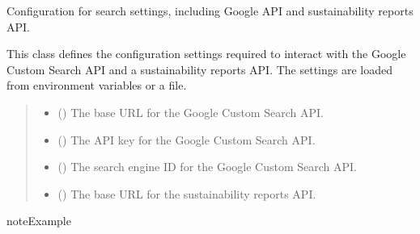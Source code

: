 \documentclass[letterpaper,10pt,english]{sphinxmanual}
\begin{document}
\begin{fulllineitems}
\sphinxAtStartPar
Configuration for search settings, including Google API and sustainability reports API.

\sphinxAtStartPar
This class defines the configuration settings required to interact with the Google Custom Search API
and a sustainability reports API. The settings are loaded from environment variables or a  file.
\begin{quote}\begin{description}
\begin{itemize}
\item {} 
\sphinxAtStartPar
{} () \textendash{} The base URL for the Google Custom Search API.

\item {} 
\sphinxAtStartPar
{} () \textendash{} The API key for the Google Custom Search API.

\item {} 
\sphinxAtStartPar
{} () \textendash{} The search engine ID for the Google Custom Search API.

\item {} 
\sphinxAtStartPar
{} () \textendash{} The base URL for the sustainability reports API.

\end{itemize}

\end{description}\end{quote}

\begin{sphinxadmonition}{note}{Example}

\begin{sphinxVerbatim}[commandchars=\\\{\}]
  
\end{sphinxVerbatim}
\end{sphinxadmonition}

\end{fulllineitems}
\end{document}
